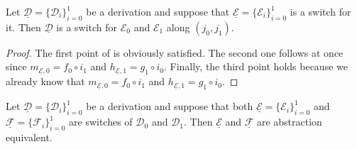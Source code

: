 \documentclass[a4paper,UKenglish,cleveref,pdftex,thm-restate,numberwithinsect]{lipics-v2021}
\newcommand{\dder}[1]{\mathscr{#1}}
\newcommand{\der}[1]{\underline{\dder{#1}}}
\begin{document}
\begin{proposition}
  \label{prop:switch}
  Let $\der{D}=\{\dder{D}_i\}_{i=0}^1$ be a derivation and suppose
  that $\der{E}=\{\dder{E}_i\}_{i=0}^1$ is a switch for it. Then
  $\der{D}$ is a switch for $\dder{E}_0$ and $\dder{E}_1$ along
  $(j_0, j_1)$.
\end{proposition}

\begin{proof}
    The first point of  is obviously satisfied. The
    second one follows at once since $m_{\der{E},0}= f_0\circ i_1$ and $h_{\der{E},1}= g_{1}\circ i_0$.    Finally, the third point holds because we already know that $m_{\der{E},0}= f_0\circ i_1$ and $h_{\der{E},1}= g_{1}\circ i_0$.
\end{proof}

\begin{lemma}
  \label{thm:switch_uni}
  Let $\der{D}=\{\dder{D}_{i}\}_{i=0}^1$ be a derivation and suppose
  that both $\der{E}=\{\dder{E}_i\}_{i=0}^1$ and
  $\der{F}=\{\dder{F}_i\}_{i=0}^1$ are switches of $\dder{D}_0$ and
  $\dder{D}_1$. Then $\der{E}$ and $\der{F}$ are abstraction
  equivalent.
\end{lemma}
\end{document}
